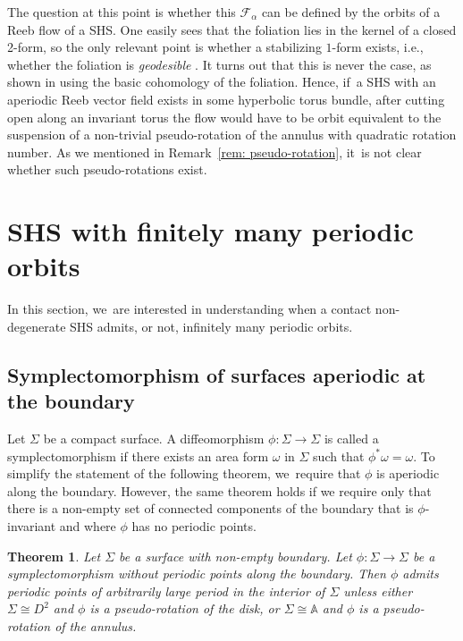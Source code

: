 \documentclass[11pt]{article}
\newcommand{\ie}{i.e.,\xspace}
\newtheorem{theorem}{Theorem}[section]
\theoremstyle{definition}
\begin{document}
The question at this point is whether this $\mathcal{F}_\alpha$ can be defined by the orbits of a Reeb flow of a SHS. One easily sees that the foliation lies in the kernel of a closed 2-form, so the only relevant point is whether a stabilizing $1$-form exists, \ie whether the foliation is \emph{geodesible} \cite{Sul}. It turns out that this is never the case, as shown in \cite[Rem.\,2.1]{Ac} using the basic cohomology of the foliation. Hence, if~a SHS with an aperiodic Reeb vector field exists in some hyperbolic torus bundle, after cutting open along an invariant torus the flow would have to be orbit equivalent to the suspension of a non-trivial pseudo-rotation of the annulus with quadratic rotation number. As we mentioned in Remark~\ref{rem: pseudo-rotation}, it~is not clear whether such pseudo-rotations exist.

\section{SHS with finitely many periodic orbits}\label{s:finite}

In this section, we~are interested in understanding when a contact non-degenerate SHS admits, or not, infinitely many periodic orbits.

\subsection{Symplectomorphism of surfaces aperiodic at the boundary}

Let $\Sigma$ be a compact surface. A diffeomorphism $\phi:\Sigma \to \Sigma$ is called a symplectomorphism if there exists an area form $\omega$ in $\Sigma$ such that $\phi^*\omega=\omega$. To simplify the statement of the following theorem, we~require that $\phi$ is aperiodic along the boundary. However, the same theorem holds if we require only that there is a non-empty set of connected components of the boundary that is $\phi$-invariant and where $\phi$ has no periodic points.

\begin{theorem} \label{thm:surfirra}
Let $\Sigma$ be a surface with non-empty boundary. Let $\phi:\Sigma \to \Sigma$ be a symplectomorphism without periodic points along the boundary. Then $\phi$ admits periodic points of arbitrarily large period in the interior of $\Sigma$ unless either $\Sigma\cong D^2$ and $\phi$ is a pseudo-rotation of the disk, or $\Sigma \cong \mathbb{A}$ and $\phi$ is a pseudo-rotation of the annulus.
\end{theorem}
\end{document}
